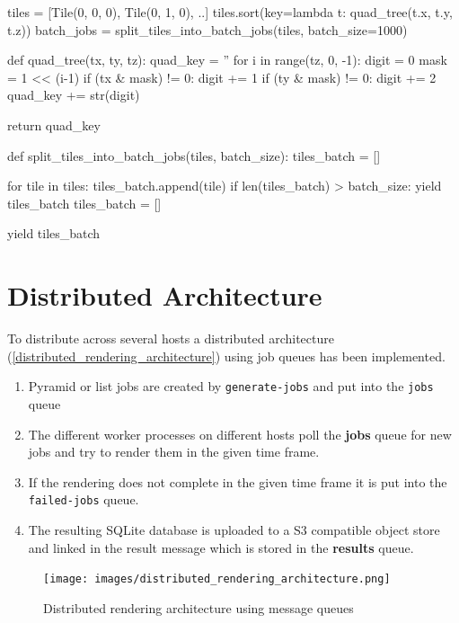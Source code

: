 \begin{pythoncode}
tiles = [Tile(0, 0, 0), Tile(0, 1, 0), ..]
tiles.sort(key=lambda t: quad_tree(t.x, t.y, t.z))
batch_jobs = split_tiles_into_batch_jobs(tiles, batch_size=1000)

def quad_tree(tx, ty, tz):
    quad_key = ''
    for i in range(tz, 0, -1):
        digit = 0
        mask = 1 << (i-1)
        if (tx & mask) != 0:
            digit += 1
        if (ty & mask) != 0:
            digit += 2
        quad_key  += str(digit)

    return quad_key
    
def split_tiles_into_batch_jobs(tiles, batch_size):
    tiles_batch = []
    
    for tile in tiles:
        tiles_batch.append(tile)
        if len(tiles_batch) > batch_size:
            yield tiles_batch
            tiles_batch = []

    yield tiles_batch
\end{pythoncode}

\newpage
\section{Distributed Architecture}

To distribute across several hosts a distributed architecture (\autoref{distributed_rendering_architecture}) using job queues has been implemented.

\begin{enumerate}  
    \item Pyramid or list jobs are created by \texttt{generate-jobs} and put into the \texttt{jobs} queue
    \item The different worker processes on different hosts poll the \textbf{jobs} queue for new jobs and try to render them in the given time frame.
    \item If the rendering does not complete in the given time frame it is put into the \texttt{failed-jobs} queue.
    \item The resulting SQLite database is uploaded to a S3 compatible object store and linked in the result message which is stored in the \textbf{results} queue.
\end{enumerate}


\begin{figure}[H]
  \centering
  \texttt{[image: images/distributed\_rendering\_architecture.png]}
  \caption{Distributed rendering architecture using message queues}
  \label{distributed_rendering_architecture}
\end{figure}

